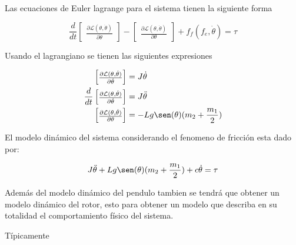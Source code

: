 \documentclass[a4paper]{IEEEtran} %
\begin{document}
Las ecuaciones de Euler lagrange para el sistema tienen la siguiente forma

\begin{equation}
    \frac{d}{dt}\begin{bmatrix}
        \frac{\partial \mathcal{L}(\theta,\dot{\theta})}{\partial\dot{\theta}}
    \end{bmatrix}-\begin{bmatrix}
        \frac{\partial \mathcal{L}(\theta,\dot{\theta})}{\partial \theta}
    \end{bmatrix}+f_f(f_e,\dot{\theta})=\tau
    \label{eq:eu_lagran}
\end{equation}

Usando el lagrangiano se tienen las siguientes expresiones

\begin{equation}
    \begin{split}
        \begin{bmatrix}
            \frac{\partial \mathcal{L}(\theta,\dot{\theta})}{\partial\dot{\theta}}
        \end{bmatrix}&=J\dot{\theta}\\
        \frac{d}{dt}\begin{bmatrix}
            \frac{\partial\mathcal{L}(\theta,\dot{\theta})}{\partial\dot{\theta}}
        \end{bmatrix}&=J\ddot{\theta}\\
        \begin{bmatrix}
            \frac{\partial \mathcal{L}(\theta,\dot{\theta})}{\partial \theta}
        \end{bmatrix}&=-Lg\sen(\theta)(m_2 + \frac{m_1}{2})\\
    \end{split}
    \label{eq:dq}
\end{equation}

El modelo dinámico del sistema considerando el fenomeno de fricción esta dado por:

\begin{equation}
    J\ddot{\theta}+Lg\sen(\theta)(m_2+\frac{m_1}{2})+c\dot{\theta}=\tau
    \label{eq:din_model}
\end{equation}

Además del modelo dinámico del pendulo tambien se tendrá que obtener un modelo dinámico del rotor, esto para obtener un modelo que describa en su totalidad el comportamiento físico del sistema.

Típicamente 



\end{document}
